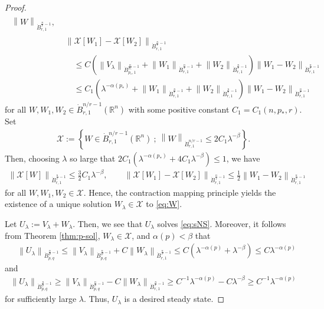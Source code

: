 \documentclass[a4paper,12pt,reqno]{amsart}
\theoremstyle{plain}
\theoremstyle{definition}
\newcommand{\dB}{\dot{B}}
\renewcommand{\leq}{\leqslant}
\renewcommand{\geq}{\geqslant}
\newcommand{\n}[1]{{\left\|#1\right\|}}
\newcommand{\R}{\mathbb{R}}
\newcommand{\Mp}[1]{\left\{#1\right\}}
\renewcommand{\sp}[1]{\left(#1\right)}
\begin{document}
\begin{proof}
\begin{align}
\begin{aligned}
{    }
    \n{W}_{\dB_{r,1}^{\frac{n}{r}-1}},
    \end{aligned}
    \\
    &
    \n{\mathcal{X}[W_1]-\mathcal{X}[W_2]}_{\dB_{r,1}^{\frac{n}{r}-1}}
    \\
    &\quad
    \leq 
    C
    \sp{
    \n{V_{\lambda}}_{\dB_{p_*,1}^{\frac{n}{p_*}-1}}
    +
    \n{W_1}_{\dB_{r,1}^{\frac{n}{r}-1}}
    +
    \n{W_2}_{\dB_{r,1}^{\frac{n}{r}-1}}
    }
    \n{W_1-W_2}_{\dB_{r,1}^{\frac{n}{r}-1}}
    \\
    &\quad
    \leq 
    C_1
    \sp{
    \lambda^{-\alpha(p_*)}
    +
    \n{W_1}_{\dB_{r,1}^{\frac{n}{r}-1}}
    +
    \n{W_2}_{\dB_{r,1}^{\frac{n}{r}-1}}
    }
    \n{W_1-W_2}_{\dB_{r,1}^{\frac{n}{r}-1}}
\end{align}
for all $W,W_1,W_2 \in \dB_{r,1}^{n/r-1}(\R^n)$ 
with some positive constant $C_1=C_1(n,p_*,r)$.
Set
\begin{align}
    \mathscr{X}:=
    \Mp{W \in \dB_{r,1}^{n/r-1}(\R^n)\ ;\ \n{W}_{\dB_{r,1}^{n/r-1}} \leq 2C_1\lambda^{-\beta}}.
\end{align}
Then,
choosing $\lambda$ so large that $2C_1\sp{\lambda^{-\alpha(p_*)}+4C_1\lambda^{-\beta}} \leq 1$, we have 
\begin{align}
    \n{\mathcal{X}[W]}_{\dB_{r,1}^{\frac{n}{r}-1}}
    \leq 
    \frac{3}{2}C_1\lambda^{-\beta},
    \qquad
    \n{\mathcal{X}[W_1]-\mathcal{X}[W_2]}_{\dB_{r,1}^{\frac{n}{r}-1}}
    \leq 
    \frac{1}{2}
    \n{W_1-W_2}_{\dB_{r,1}^{\frac{n}{r}-1}}
\end{align}
for all $W,W_1,W_2 \in \mathscr{X}$.
Hence, the contraction mapping principle yields the existence of a unique solution $W_{\lambda} \in \mathscr{X}$ to \eqref{eq:W}. 

Let $U_{\lambda}:=V_{\lambda}+W_{\lambda}$. Then, we see that $U_{\lambda}$ solves \eqref{eq:sNS}.
Moreover, it follows from Theorem \ref{thm:p-sol}, $W_{\lambda} \in \mathscr{X}$, and $\alpha(p)<\beta$ that 
\begin{align}
    &
    \n{U_{\lambda}}_{\dB_{p,q}^{\frac{n}{p}-1}} 
    \leq 
    \n{V_{\lambda}}_{\dB_{p,q}^{\frac{n}{p}-1}}
    +
    C
    \n{W_{\lambda}}_{\dB_{r,1}^{\frac{n}{r}-1}}
    \leq 
    C\sp{\lambda^{-\alpha(p)}+\lambda^{-\beta}}
    \leq 
    C\lambda^{-\alpha(p)}
\end{align}
and
\begin{align}
    \n{U_{\lambda}}_{\dB_{p,q}^{\frac{n}{p}-1}} 
    \geq 
    \n{V_{\lambda}}_{\dB_{p,q}^{\frac{n}{p}-1}}
    -
    C
    \n{W_{\lambda}}_{\dB_{r,1}^{\frac{n}{r}-1}}
    \geq 
    C^{-1}\lambda^{-\alpha(p)}-C\lambda^{-\beta}
    \geq 
    C^{-1}\lambda^{-\alpha(p)}
\end{align}
for sufficiently large $\lambda$.
Thus, $U_{\lambda}$ is a desired steady state.
%


\end{proof}
\end{document}
